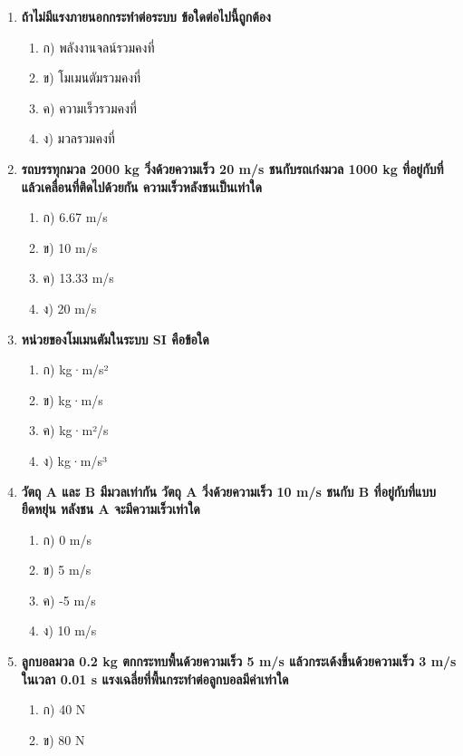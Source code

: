 \documentclass[12pt]{article}
\begin{document}
\begin{enumerate}
\begin{enumerate}
\item ก) 1 N·s
\item ข) 4.5 N·s
\item ค) 9 N·s
\item ง) 18 N·s
\end{enumerate}
\item \textbf{ถ้าไม่มีแรงภายนอกกระทำต่อระบบ ข้อใดต่อไปนี้ถูกต้อง}
\begin{enumerate}
\item ก) พลังงานจลน์รวมคงที่
\item ข) โมเมนตัมรวมคงที่
\item ค) ความเร็วรวมคงที่
\item ง) มวลรวมคงที่
\end{enumerate}
\item \textbf{รถบรรทุกมวล 2000 kg วิ่งด้วยความเร็ว 20 m/s ชนกับรถเก๋งมวล 1000 kg ที่อยู่กับที่ แล้วเคลื่อนที่ติดไปด้วยกัน ความเร็วหลังชนเป็นเท่าใด}
\begin{enumerate}
\item ก) 6.67 m/s
\item ข) 10 m/s
\item ค) 13.33 m/s
\item ง) 20 m/s
\end{enumerate}
\item \textbf{หน่วยของโมเมนตัมในระบบ SI คือข้อใด}
\begin{enumerate}
\item ก) kg·m/s²
\item ข) kg·m/s
\item ค) kg·m²/s
\item ง) kg·m/s³
\end{enumerate}
\item \textbf{วัตถุ A และ B มีมวลเท่ากัน วัตถุ A วิ่งด้วยความเร็ว 10 m/s ชนกับ B ที่อยู่กับที่แบบยืดหยุ่น หลังชน A จะมีความเร็วเท่าใด}
\begin{enumerate}
\item ก) 0 m/s
\item ข) 5 m/s
\item ค) -5 m/s
\item ง) 10 m/s
\end{enumerate}
\item \textbf{ลูกบอลมวล 0.2 kg ตกกระทบพื้นด้วยความเร็ว 5 m/s แล้วกระเด้งขึ้นด้วยความเร็ว 3 m/s ในเวลา 0.01 s แรงเฉลี่ยที่พื้นกระทำต่อลูกบอลมีค่าเท่าใด}
\begin{enumerate}
\item ก) 40 N
\item ข) 80 N

\end{enumerate}
\end{enumerate}
\end{document}
